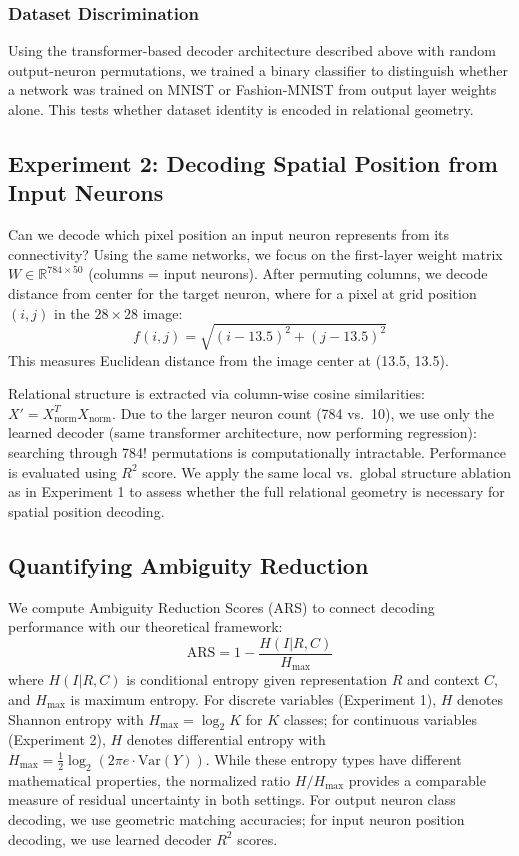 \subsubsection{Dataset Discrimination}

Using the transformer-based decoder architecture described above with random output-neuron permutations, we trained a binary classifier to distinguish whether a network was trained on MNIST or Fashion-MNIST from output layer weights alone. This tests whether dataset identity is encoded in relational geometry.

\subsection{Experiment 2: Decoding Spatial Position from Input Neurons}

Can we decode which pixel position an input neuron represents from its connectivity? Using the same networks, we focus on the first-layer weight matrix $W \in \mathbb{R}^{784 \times 50}$ (columns = input neurons). After permuting columns, we decode distance from center for the target neuron, where for a pixel at grid position $(i,j)$ in the $28 \times 28$ image:
\begin{equation}
f(i,j) = \sqrt{(i-13.5)^2 + (j-13.5)^2}
\end{equation}
This measures Euclidean distance from the image center at (13.5, 13.5).

Relational structure is extracted via column-wise cosine similarities: $X' = X_{\text{norm}}^T X_{\text{norm}}$. Due to the larger neuron count (784 vs.\ 10), we use only the learned decoder (same transformer architecture, now performing regression): searching through 784! permutations is computationally intractable. Performance is evaluated using $R^2$ score. We apply the same local vs.\ global structure ablation as in Experiment 1 to assess whether the full relational geometry is necessary for spatial position decoding.

\subsection{Quantifying Ambiguity Reduction}

We compute Ambiguity Reduction Scores (ARS) to connect decoding performance with our theoretical framework:
\begin{equation}
\text{ARS} = 1 - \frac{H(I|R,C)}{H_{\max}}
\end{equation}
where $H(I|R,C)$ is conditional entropy given representation $R$ and context $C$, and $H_{\max}$ is maximum entropy. For discrete variables (Experiment 1), $H$ denotes Shannon entropy with $H_{\max} = \log_2 K$ for $K$ classes; for continuous variables (Experiment 2), $H$ denotes differential entropy with $H_{\max} = \frac{1}{2}\log_2(2\pi e \cdot \text{Var}(Y))$. While these entropy types have different mathematical properties, the normalized ratio $H/H_{\max}$ provides a comparable measure of residual uncertainty in both settings. For output neuron class decoding, we use geometric matching accuracies; for input neuron position decoding, we use learned decoder $R^2$ scores.

